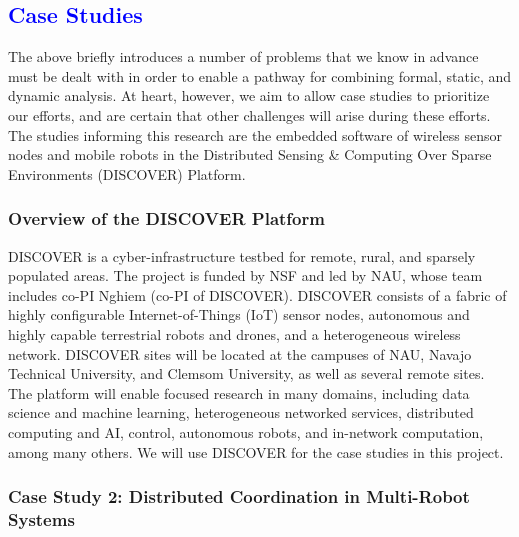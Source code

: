 \subsection{\textcolor{blue}{Case Studies}} %
\label{sec:case-study}

The above briefly introduces a number of problems that we know in advance must
be dealt with in order to enable a pathway for combining formal,
static, and dynamic analysis.    At heart, however, we aim to allow
case studies to prioritize our efforts, and
are certain that other challenges will arise during these efforts.
The studies informing this research are the embedded software of %
wireless sensor nodes and mobile robots in the Distributed Sensing \& Computing Over Sparse Environments (DISCOVER) Platform.

\subsubsection{Overview of the DISCOVER Platform}
\label{sec:cast-study:discover}

DISCOVER %
is a cyber-infrastructure testbed for remote, rural, and sparsely populated areas.
The project is funded by NSF and led by NAU, whose team includes co-PI Nghiem (co-PI of DISCOVER).
DISCOVER consists of a fabric of highly configurable Internet-of-Things (IoT) sensor nodes, autonomous and highly capable terrestrial robots and drones, and a heterogeneous wireless network.
DISCOVER sites will be located at the campuses of NAU, Navajo Technical University, and Clemsom University, as well as several remote sites.
The platform will enable focused research in many domains, including data science and machine learning, heterogeneous networked services, distributed computing and AI, control, autonomous robots, and in-network computation, among many others.
%
We will use DISCOVER for the case studies in this project.



\subsubsection{Case Study 2: Distributed Coordination in Multi-Robot Systems}
\label{sec:case-study-robots}




